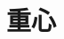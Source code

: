 \documentclass[../../all/physics-standard_answers_all.tex]{subfiles}
\begin{document}
\section{重心}
\end{document}

